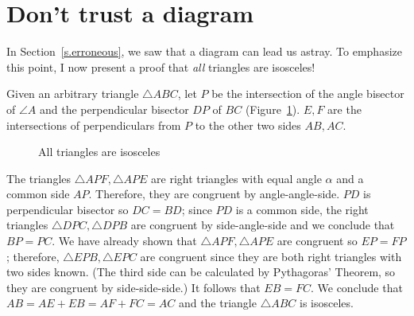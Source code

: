 \documentclass[11pt,a4paper]{article}
\begin{document}

\section{Don't trust a diagram}

In Section~\ref{s.erroneous}, we saw that a diagram can lead us astray. To emphasize this point, I now present a proof that \emph{all} triangles are isosceles!

Given an arbitrary triangle $\triangle ABC$, let $P$ be the intersection of the angle bisector of $\angle A$ and the perpendicular bisector $DP$ of $BC$ (Figure~\ref{fig.isosceles}). $E,F$ are the intersections of perpendiculars from $P$ to the other two sides $AB,AC$.
\begin{figure}[H]
\begin{center}
\caption{All triangles are isosceles}\label{fig.isosceles}
\end{center}
\end{figure}
\vspace*{-4ex}
The triangles $\triangle APF, \triangle APE$ are right triangles with equal angle $\alpha$ and a common side $AP$. Therefore, they are congruent by angle-angle-side. $PD$ is perpendicular bisector so $DC=BD$; since $PD$ is a common side, the right triangles $\triangle DPC, \triangle DPB$ are congruent by side-angle-side and we conclude that $BP=PC$. We have already shown that $\triangle APF, \triangle APE$ are congruent so $EP=FP$; therefore, $\triangle EPB, \triangle EPC$ are congruent since they are both right triangles with two sides known. (The third side can be calculated by Pythagoras' Theorem, so they are congruent by side-side-side.) It follows that $EB=FC$. We conclude that $AB= AE+EB=AF+FC =AC$ and the triangle $\triangle ABC$ is isosceles.
\end{document}
